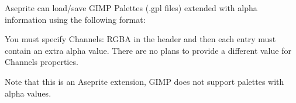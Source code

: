 Aseprite can load/save GIMP Palettes ({\ttfamily .gpl} files) extended with alpha information using the following format\+:


\begin{DoxyCode}{0}
\DoxyCodeLine{\#}

\end{DoxyCode}


You must specify {\ttfamily Channels\+: RGBA} in the header and then each entry must contain an extra alpha value. There are no plans to provide a different value for {\ttfamily Channels} properties.

Note that this is an Aseprite extension, GIMP does not support palettes with alpha values. 